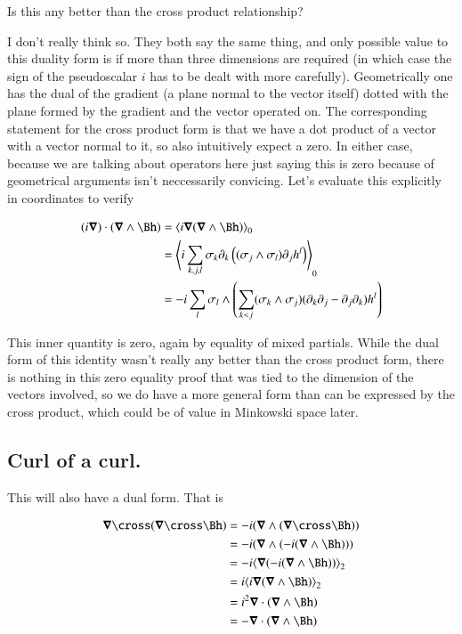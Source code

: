 \documentclass{article}
\begin{document}
Is this any better than the cross product relationship?

I don't really think so.  They both say the same thing, and only possible value to this duality form is if more than three dimensions are required (in which case the sign of the pseudoscalar $i$ has to be dealt with more carefully).  Geometrically one has the dual of the gradient (a plane normal to the vector itself) dotted with the plane formed by the gradient and the vector operated on.  The corresponding statement for the cross product form is that we have a dot product of a vector with a vector normal to it, so also intuitively expect a zero.  In either case, because we are talking about operators here
just saying this is zero because of geometrical arguments isn't neccessarily convicing.  Let's evaluate this explicitly in 
coordinates to verify

\begin{align*}
(i \spacegrad) \cdot (\spacegrad \wedge \Bh) 
&= \gpgradezero{i \spacegrad (\spacegrad \wedge \Bh) } \\
&= \gpgradezero{i \sum_{k,j,l} \sigma_k \partial_k \left((\sigma_j \wedge \sigma_l) \partial_j h^l\right) } \\
&= -i \sum_{l} \sigma_l \wedge \left( \sum_{k<j} (\sigma_k \wedge \sigma_j) (\partial_k \partial_j -\partial_j \partial_k) h^l \right) \\
\end{align*}

This inner quantity is zero, again by equality of mixed partials.  While the dual form of this identity wasn't really any better than the cross
product form, there is nothing in this zero equality proof that was tied to the dimension of the vectors involved, so we do have a more general form
than can be expressed by the cross product, which could be of value in Minkowski space later.

\subsection{ Curl of a curl. }

This will also have a dual form.  That is

\begin{align*}
\spacegrad \cross (\spacegrad \cross \Bh)
&= -i (\spacegrad \wedge (\spacegrad \cross \Bh)) \\
&= -i (\spacegrad \wedge (-i (\spacegrad \wedge \Bh))) \\
&= -i \gpgradetwo{\spacegrad (-i (\spacegrad \wedge \Bh))} \\
&= i \gpgradetwo{i \spacegrad (\spacegrad \wedge \Bh)} \\
&= i^2 \spacegrad \cdot (\spacegrad \wedge \Bh) \\
&= - \spacegrad \cdot (\spacegrad \wedge \Bh) \\
\end{align*}
\end{document}
